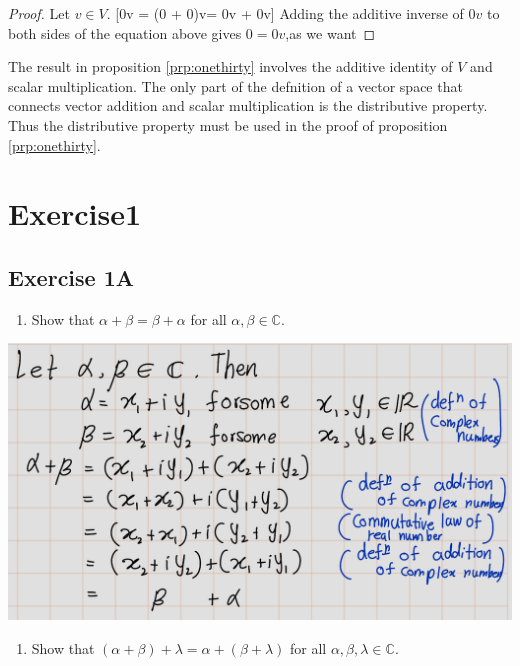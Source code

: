 \documentclass[
]{book}
\providecommand{\tightlist}{%
  \setlength{\itemsep}{0pt}\setlength{\parskip}{0pt}}
\theoremstyle{definition}
\theoremstyle{definition}
\theoremstyle{definition}
\theoremstyle{definition}
\theoremstyle{remark}
\begin{document}
\begin{proof}
Let \(v\in V\).
{[}0v = (0 + 0)v= 0v + 0v{]}
Adding the additive inverse of \(0v\) to both sides of the equation above gives \(0 =0v\),as we want
\end{proof}

The result in proposition \ref{prp:onethirty} involves the additive identity of \(V\) and scalar multiplication.
The only part of the defnition of a vector space that connects vector addition and scalar multiplication is the distributive property. Thus the distributive property must be used in the proof of proposition \ref{prp:onethirty}.

\chapter{Exercise1}\label{exercise1}

\section{Exercise 1A}\label{exercise-1a}

\begin{enumerate}
\def\labelenumi{\arabic{enumi}.}
\tightlist
\item
  Show that \(\alpha + \beta = \beta + \alpha\) for all \(\alpha, \beta \in \mathbb{C}\).
\end{enumerate}

\includegraphics[width=17.65in]{fig/Ex1A/Ex1}

\begin{enumerate}
\def\labelenumi{\arabic{enumi}.}
\setcounter{enumi}{1}
\tightlist
\item
  Show that \((\alpha + \beta) + \lambda = \alpha + (\beta + \lambda)\) for all \(\alpha, \beta, \lambda \in \mathbb{C}\).
\end{enumerate}
\end{document}
